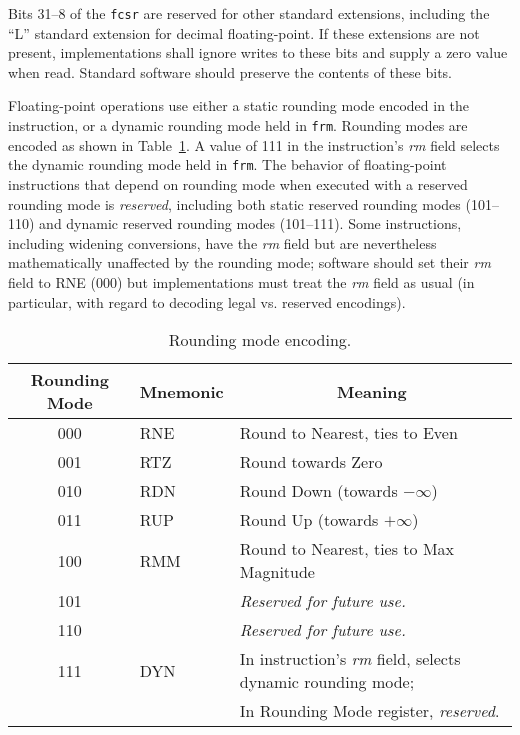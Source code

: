 Bits 31--8 of the {\tt fcsr} are reserved for other standard extensions,
including the ``L'' standard extension for decimal floating-point.  If
these extensions are not present, implementations shall ignore writes to
these bits and supply a zero value when read.  Standard software should
preserve the contents of these bits.

Floating-point operations use either a static rounding mode encoded in
the instruction, or a dynamic rounding mode held in {\tt frm}.
Rounding modes are encoded as shown in Table~\ref{rm}.  A value of 111
in the instruction's {\em rm} field selects the dynamic rounding mode
held in {\tt frm}.  The behavior of floating-point instructions that
depend on rounding mode when executed with a reserved rounding mode is
{\em reserved}, including both static reserved rounding modes (101--110) and
dynamic reserved rounding modes (101--111).  Some instructions, including
widening conversions, have the {\em rm} field but are nevertheless
mathematically unaffected by the rounding mode; software should set their
{\em rm} field to RNE (000) but implementations must treat the {\em rm}
field as usual (in particular, with regard to decoding legal vs. reserved
encodings).

\begin{table}[htp]
\begin{small}
\begin{center}
\begin{tabular}{ccl}
\hline
\multicolumn{1}{|c|}{Rounding Mode} &
\multicolumn{1}{c|}{Mnemonic} &
\multicolumn{1}{c|}{Meaning} \\
\hline
\multicolumn{1}{|c|}{000} &
\multicolumn{1}{l|}{RNE} &
\multicolumn{1}{l|}{Round to Nearest, ties to Even}\\
\hline
\multicolumn{1}{|c|}{001} &
\multicolumn{1}{l|}{RTZ} &
\multicolumn{1}{l|}{Round towards Zero}\\
\hline
\multicolumn{1}{|c|}{010} &
\multicolumn{1}{l|}{RDN} &
\multicolumn{1}{l|}{Round Down (towards $-\infty$)}\\
\hline
\multicolumn{1}{|c|}{011} &
\multicolumn{1}{l|}{RUP} &
\multicolumn{1}{l|}{Round Up (towards $+\infty$)}\\
\hline
\multicolumn{1}{|c|}{100} &
\multicolumn{1}{l|}{RMM} &
\multicolumn{1}{l|}{Round to Nearest, ties to Max Magnitude}\\
\hline
\multicolumn{1}{|c|}{101} &
\multicolumn{1}{l|}{} &
\multicolumn{1}{l|}{\em Reserved for future use.}\\
\hline
\multicolumn{1}{|c|}{110} &
\multicolumn{1}{l|}{} &
\multicolumn{1}{l|}{\em Reserved for future use.}\\
\hline
\multicolumn{1}{|c|}{111} &
\multicolumn{1}{l|}{DYN} &
\multicolumn{1}{l|}{In instruction's {\em rm} field, selects dynamic rounding mode;}\\
\multicolumn{1}{|c|}{} &
\multicolumn{1}{l|}{} &
\multicolumn{1}{l|}{In Rounding Mode register, {\em reserved}.}\\
\hline
\end{tabular}
\end{center}
\end{small}
\caption{Rounding mode encoding.}
\label{rm}
\end{table}

